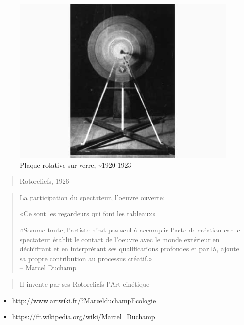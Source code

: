 \documentclass[
  french,
]{book}
\providecommand{\tightlist}{%
  \setlength{\itemsep}{0pt}\setlength{\parskip}{0pt}}
\begin{document}
\begin{figure}
\centering
\includegraphics{medias/corpus/duchamp/MarcelduchampEcologie_ducha_rotative_plaque_verre_20140917224650_20140917225046.jpg}
\caption{Plaque rotative sur verre, \textasciitilde1920-1923}
\end{figure}

\begin{quote}
Rotoreliefs, 1926
\end{quote}

\begin{quote}
La participation du spectateur, l'oeuvre ouverte:

«Ce sont les regardeurs qui font les tableaux»

«Somme toute, l'artiste n'est pas seul à accomplir l'acte de création car le spectateur établit le contact de l'oeuvre avec le monde extérieur en déchiffrant et en interprétant ses qualifications profondes et par là, ajoute sa propre contribution au processus créatif.»\\
-- Marcel Duchamp
\end{quote}

\begin{quote}
Il invente par ses Rotoreliefs l'Art cinétique
\end{quote}

\begin{itemize}
\tightlist
\item
  \url{http://www.artwiki.fr/?MarcelduchampEcologie}
\item
  \url{https://fr.wikipedia.org/wiki/Marcel_Duchamp}
\end{itemize}
\end{document}
